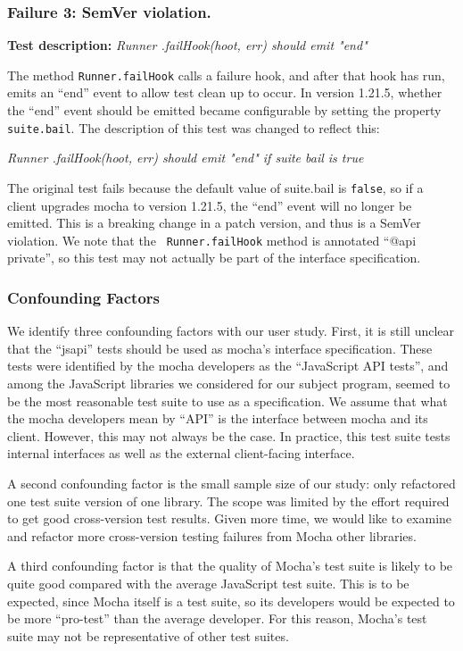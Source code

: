 \subsubsection{Failure 3: SemVer violation.}
\label{sec:failure3}
{\bf Test description:}
%
{\em Runner .failHook(hoot, err) should emit "end" }

The method {\tt Runner.failHook} calls a failure hook, and after that
hook has run, emits an ``end'' event to allow test clean up to occur. In
version 1.21.5, whether the ``end'' event should be emitted became
configurable by setting the property {\tt suite.bail}. The
description of this test was changed to reflect this:

{\em Runner .failHook(hoot, err) should emit "end" if suite bail is
  true }

The original test fails because the default value of suite.bail is
{\tt false}, so if a client upgrades mocha to version 1.21.5, the
``end'' event will no longer be emitted. This is a breaking change in
a patch version, and thus is a SemVer violation. We note that the {\tt
  Runner.failHook} method is annotated ``@api private'', so this test
may not actually be part of the interface specification.

\subsubsection{Confounding Factors}
We identify three confounding factors with our user study. First, it
is still unclear that the ``jsapi'' tests should be used as mocha's
interface specification. These tests were identified by the mocha
developers as the ``JavaScript API tests'', and among the JavaScript
libraries we considered for our subject program, seemed to be the most
reasonable test suite to use as a specification. We assume that what
the mocha developers mean by ``API'' is the interface between mocha and
its client. However, this may not always be the case. In practice, this
test suite tests internal interfaces as well as the external
client-facing interface.

A second confounding factor is the small sample size of our study:
only refactored one test suite version of one library. The scope was
limited by the effort required to get good cross-version test
results. Given more time, we would like to examine and refactor more
cross-version testing failures from Mocha other libraries.

A third confounding factor is that the quality of Mocha's test suite
is likely to be quite good compared with the average JavaScript test
suite. This is to be expected, since Mocha itself is a test suite, so
its developers would be expected to be more ``pro-test'' than the
average developer. For this reason, Mocha's test suite may not be
representative of other test suites.


